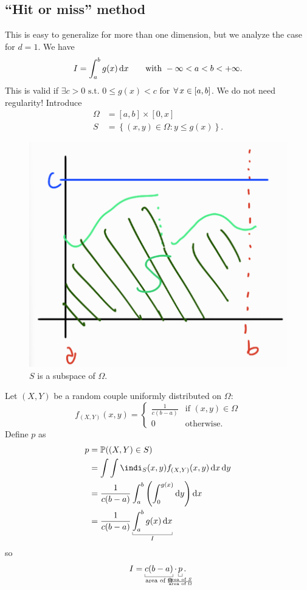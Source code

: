 \documentclass[12pt]{report}
\begin{document}
\subsection{``Hit or miss'' method}
This is easy to generalize for more than one dimension, but we analyze the case for $d=1$. We have
\begin{equation*}
	I=\int_{a}^{b}g(x)\mathop{}\!\mathrm{d} x\qquad\text{with }-\infty<a<b<+\infty.
\end{equation*}
This is valid if $\exists c>0\text{ s.t. }0\leq g(x)<c$ for $\forall\, x\in[a,b]$. We do not need regularity! Introduce
\begin{align*}
	\Omega&=[a,b]\times[0,x]\\
	S&=\left\{(x,y)\in\Omega:y\leq g(x)\right\}.
\end{align*}
\begin{figure}[H]
	\centering
	\includegraphics[width=0.4\linewidth]{img/screenshot067}
	\caption{$S$ is a subspace of $\Omega$.}
	\label{fig:screenshot067}
\end{figure}
Let $(X,Y)$ be a random couple uniformly distributed on $\Omega$:
\begin{equation*}
	f_{(X,Y)}(x,y)=\begin{cases}
		\frac{1}{c(b-a)}&\text{if }(x,y)\in\Omega\\
		0&\text{otherwise}.
	\end{cases}
\end{equation*}
Define $p$ as
\begin{align*}
	p&=\pr((X,Y)\in S)\\
	&=\int\int\indi_S(x,y)f_{(X,Y)}(x,y)\dx\dy\\
	&=\frac{1}{c(b-a)}\int_{a}^{b}\left(\int_{0}^{g(x)}\dy\right)\dx\\
	&=\frac{1}{c(b-a)}\ubracketthin{\int_{a}^{b}g(x)\dx}_{I}
\end{align*}
so 
\begin{equation*}
	I=\ubracketthin{c(b-a)}_{\claptext{area of $\Omega$}}\cdot\ubracketthin{p}_{\mathclap{\frac{\text{area of }S}{\text{area of }\Omega}}}.
\end{equation*}
\end{document}
